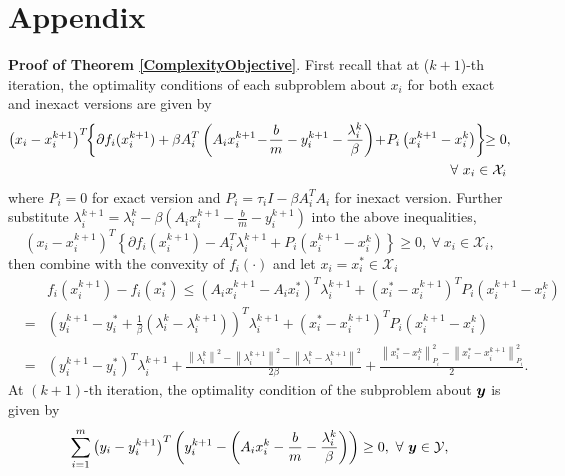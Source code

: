 \documentclass{mcom-l}
\theoremstyle{definition}
\theoremstyle{remark}
\numberwithin{equation}{section}
\begin{document}
\section{Appendix}\label{seeAppendix}
{\bf{Proof of Theorem \ref{ComplexityObjective}}}. First recall that at ($k+1$)-th iteration, the optimality conditions of each subproblem about $x_i$ for both exact and inexact versions are given by
\begin{align}
\left(x_i - x_i^{k+1}\right)^T \!\!\left\{ \partial f_i (x_i^{k+1}) + \beta A_i^T \left( A_i x_i^{k+1} \!-\! \frac{b}{m} - y_i^{k+1} - \frac{\lambda_i^k}{\beta} \right) \!+\! P_i \left( x_i^{k+1} - x_i^k \right) \right\}\!\!\ge 0&,\nonumber\\
\vspace{-4cm}\forall\ x_i\in {\mathcal{X}}_i&\nonumber
\end{align}
where $P_i = 0$ for exact version and $P_i = \tau_i I - \beta A_i^T A_i$ for inexact version. Further substitute $\lambda_i^{k+1} = \lambda_i^k - \beta\left( A_i x_i^{k+1} - \frac{b}{m} - y_i^{k+1} \right)$ into the above inequalities,
$$
\left(x_i - x_i^{k+1}\right)^T \left\{ \partial f_i (x_i^{k+1}) - A_i^T \lambda_i^{k+1} + P_i \left( x_i^{k+1} - x_i^k \right) \right\}\ge 0,\ \forall\ x_i\in {\mathcal{X}}_i,
$$
then combine with the convexity of $f_i(\cdot)$ and let $x_i = x_i^*\in {\mathcal{X}}_i$
{\small\begin{eqnarray}\label{AppendixBasic}
\!\!\!&&\!\!\!\!\!f_i(x_i^{k+1}) - f_i(x_i^*)\le \left( A_i x_i^{k+1} - A_i x_i^* \right)^T \lambda_i^{k+1} + \left( x_i^* - x_i^{k+1} \right)^T P_i \left( x_i^{k+1} - x_i^k \right)\nonumber\\
\!\!\!&=&\!\!\!\!\!\! \left( y_i^{k+1} - y_i^* + \frac{1}{\beta} \left( \lambda_i^k - \lambda_i^{k+1} \right) \right)^T \lambda_i^{k+1} + \left( x_i^* - x_i^{k+1} \right)^T P_i \left( x_i^{k+1} - x_i^k \right)\nonumber\\
\!\!\!&=&\!\!\!\!\!\! \left( y_i^{k+1} \!-\! y_i^* \right)^T\!\! \lambda_i^{k+1} \!\!+\! \frac{\left\|\lambda_i^k\right\|^2 \!\!\!-\! \left\| \lambda_i^{k+1} \right\|^2 \!\!\!-\! \left\| \lambda_i^k \!-\! \lambda_i^{k+1} \right\|^2}{2\beta} \!+\! \frac{\left\|x_i^* \!\!-\! x_i^k \right\|_{P_i}^2 \!\!\!-\! \left\| x_i^* \!\!-\! x_i^{k+1} \right\|_{P_i}^2}{2}.
\end{eqnarray}}
At $(k+1)$-th iteration,  the optimality condition of the subproblem about ${{\mbox{\boldmath $y$}}}$ is given by
$$
\sum_{i=1}^m \left( y_i - y_i^{k+1} \right)^T \left( y_i^{k+1} - \left( A_i x_i^k - \frac{b}{m} - \frac{\lambda_i^k}{\beta}\right) \right) \ge 0,\ \forall\ {{\mbox{\boldmath $y$}}}\in {\mathcal{Y}},
$$
\end{document}
